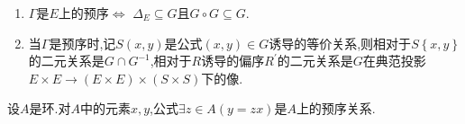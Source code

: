 \begin{remark}{}{}
	\begin{enumerate}
		\item $\Gamma$是$E$上的预序$\iff$ $\Delta_{E}\subseteq G$且$G\circ G\subseteq G$.
		\item 当$\Gamma$是预序时,记$S\left(x,y\right)$是公式$\left(x,y\right)\in G$诱导的等价关系,则相对于$S\left\{x,y\right\}$的二元关系是$G\cap G^{-1}$,相对于$R$诱导的偏序$R^{\prime}$的二元关系是$G$在典范投影$E\times E\to\left(E\times E\right)\times\left(S\times S\right)$下的像.
	\end{enumerate}
\end{remark}

\begin{example}{}{}
	设$A$是环.对$A$中的元素$x,y$,公式$\exists z\in A\left(y=zx\right)$是$A$上的预序关系.
\end{example}












































































